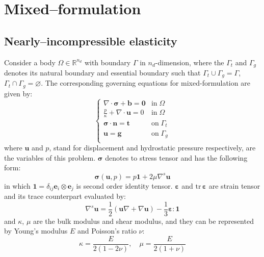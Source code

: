 \section{Mixed--formulation}
\subsection{Nearly--incompressible elasticity}
Consider a body $\Omega \in \mathbb R^{n_d}$ with boundary $\Gamma$ in $n_d$-dimension, where the $\Gamma_t$ and $\Gamma_g$ denotes its natural boundary and essential boundary such that $\Gamma_t \cup \Gamma_g = \Gamma$, $\Gamma_t \cap \Gamma_g = \varnothing$. The corresponding governing equations for mixed-formulation are given by:
\begin{equation}\label{strong}
\begin{cases}
    \nabla \cdot \boldsymbol \sigma + \boldsymbol b = \boldsymbol 0 & \mathrm{in} \; \Omega \\
    \frac{p}{\kappa} + \nabla \cdot \boldsymbol u = 0 & \mathrm{in} \; \Omega \\
    \boldsymbol \sigma \cdot \boldsymbol n = \boldsymbol t & \mathrm{on} \; \Gamma_t \\
    \boldsymbol u = \boldsymbol g & \mathrm{on} \; \Gamma_g \\
\end{cases}
\end{equation}
where $\boldsymbol u$ and $p$, stand for displacement and hydrostatic pressure respectively, are the variables of this problem. $\boldsymbol \sigma$ denotes to stress tensor and has the following form: 
\begin{equation}\label{stress}
    \boldsymbol \sigma(\boldsymbol u, p) = p \boldsymbol 1 + 2\mu \nabla^s \boldsymbol u
\end{equation}
in which $\boldsymbol 1 = \delta_{ij} \boldsymbol e_i \otimes \boldsymbol e_j$ is second order identity tensor.
$\boldsymbol \varepsilon$ and $\mathrm{tr}\,\boldsymbol \varepsilon$ are strain tensor and its trace counterpart evaluated by:
\begin{equation}
\nabla^s \boldsymbol u = \frac{1}{2}(\boldsymbol u \nabla + \nabla \boldsymbol u) -\frac{1}{3} \boldsymbol \varepsilon : \boldsymbol 1
\end{equation}
and $\kappa$, $\mu$ are the bulk modulus and shear modulus, and they can be represented by Young's modulus $E$ and Poisson's ratio $\nu$:
\begin{equation}\label{modulus}
\kappa = \frac{E}{2(1-2\nu)}, \quad \mu = \frac{E}{2(1+\nu)}
\end{equation}

